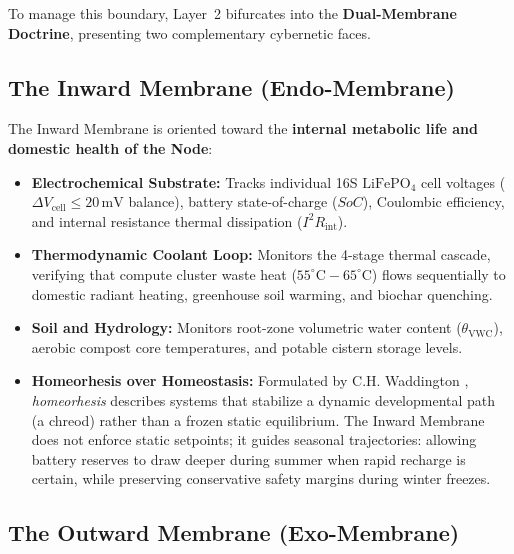 To manage this boundary, Layer~2 bifurcates into the \textbf{Dual-Membrane Doctrine}, presenting two complementary cybernetic faces.

\subsection{The Inward Membrane (Endo-Membrane)}

The Inward Membrane is oriented toward the \textbf{internal metabolic life and domestic health of the Node}:
\begin{itemize}
    \item \textbf{Electrochemical Substrate:} Tracks individual 16S $\mathrm{LiFePO}_4$ cell voltages ($\Delta V_{\mathrm{cell}} \le 20\,\mathrm{mV}$ balance), battery state-of-charge ($SoC$), Coulombic efficiency, and internal resistance thermal dissipation ($I^2 R_{\mathrm{int}}$).
    \item \textbf{Thermodynamic Coolant Loop:} Monitors the 4-stage thermal cascade, verifying that compute cluster waste heat ($55^\circ\mathrm{C}-65^\circ\mathrm{C}$) flows sequentially to domestic radiant heating, greenhouse soil warming, and biochar quenching.
    \item \textbf{Soil and Hydrology:} Monitors root-zone volumetric water content ($\theta_{\mathrm{VWC}}$), aerobic compost core temperatures, and potable cistern storage levels.
    \item \textbf{Homeorhesis over Homeostasis:} Formulated by C.H. Waddington \parencite{waddington1957}, \textit{homeorhesis} describes systems that stabilize a dynamic developmental path (a chreod) rather than a frozen static equilibrium. The Inward Membrane does not enforce static setpoints; it guides seasonal trajectories: allowing battery reserves to draw deeper during summer when rapid recharge is certain, while preserving conservative safety margins during winter freezes.
\end{itemize}

\subsection{The Outward Membrane (Exo-Membrane)}

